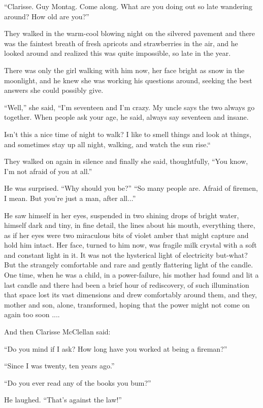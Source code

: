 \documentclass[11pt,openany]{book}
\begin{document}
``Clarisse. Guy Montag. Come along. What are you doing out so late wandering around? How old are you?''

They walked in the warm-cool blowing night on the silvered pavement and there was the faintest breath of fresh apricots and strawberries in the air, and he looked around and realized this was quite impossible, so late in the year.

There was only the girl walking with him now, her face bright as snow in the moonlight, and he knew she was working his questions around, seeking the best answers she could possibly give.

``Well,'' she said, ``I'm seventeen and I'm crazy. My uncle says the two always go together. When people ask your age, he said, always say seventeen and insane.

Isn't this a nice time of night to walk? I like to smell things and look at things, and sometimes stay up all night, walking, and watch the sun rise.``

They walked on again in silence and finally she said, thoughtfully, ``You know, I'm not afraid of you at all.''

He was surprised. ``Why should you be?'' ``So many people are. Afraid of firemen, I mean. But you're just a man, after all...''

He saw himself in her eyes, suspended in two shining drops of bright water, himself dark and tiny, in fine detail, the lines about his mouth, everything there, as if her eyes were two miraculous bits of violet amber that might capture and hold him intact. Her face, turned to him now, was fragile milk crystal with a soft and constant light in it. It was not the hysterical light of electricity but-what? But the strangely comfortable and rare and gently flattering light of the candle. One time, when he was a child, in a power-failure, his mother had found and lit a last candle and there had been a brief hour of rediscovery, of such illumination that space lost its vast dimensions and drew comfortably around them, and they, mother and son, alone, transformed, hoping that the power might not come on again too soon ....

And then Clarisse McClellan said:

``Do you mind if I ask? How long have you worked at being a fireman?''

``Since I was twenty, ten years ago.''

``Do you ever read any of the books you bum?''

He laughed. ``That's against the law!''
\end{document}

